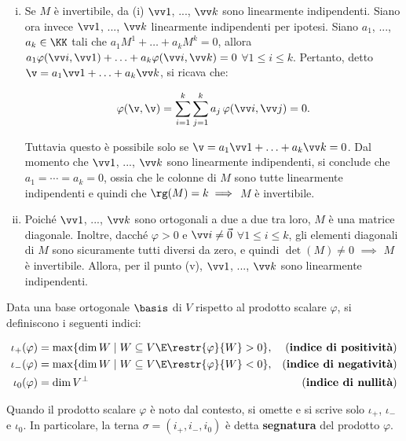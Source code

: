 \documentclass[11pt]{article}
\begin{document}
\begin{solution}
\begin{enumerate}[(i)]
			\item Se $M$ è invertibile, da (i) $\vv1$, ..., $\vv k$ sono linearmente indipendenti. Siano ora
			invece $\vv 1$, ..., $\vv k$ linearmente indipendenti per ipotesi. Siano $a_1$, ..., $a_k \in \KK$ tali
			che $a_1 M^1 + \ldots + a_k M^k = 0$, allora $a_1 \varphi(\vv i, \vv 1) + \ldots + a_k \varphi(\vv i, \vv k) = 0$ $\forall 1 \leq i \leq k$. Pertanto, detto $\v = a_1 \vv 1 + \ldots + a_k \vv k$, si ricava che:
			
			\[ \varphi(\v, \v) = \sum_{i=1}^k \sum_{j=1}^k a_j \, \varphi(\vv i, \vv j) = 0. \]
			
			Tuttavia questo è possibile solo se $\v = a_1 \vv 1 + \ldots + a_k \vv k = 0$. Dal momento che
			$\vv 1$, ..., $\vv k$ sono linearmente indipendenti, si conclude che $a_1 = \cdots = a_k = 0$, ossia
			che le colonne di $M$ sono tutte linearmente indipendenti e quindi che $\rg(M) = k \implies$ $M$ è invertibile.
			
			\item Poiché $\vv 1$, ..., $\vv k$ sono ortogonali a due a due tra loro, $M$ è una matrice diagonale.
			Inoltre, dacché $\varphi > 0$ e $\vv i \neq \vec 0$ $\forall 1 \leq i \leq k$, gli elementi diagonali di $M$ sono sicuramente tutti diversi da zero, e quindi $\det (M) \neq 0$ $\implies$ $M$ è invertibile. Allora,
			per il punto (v), $\vv 1$, ..., $\vv k$ sono linearmente indipendenti.
		\end{enumerate}
	\end{solution}

	\begin{definition}
		Data una base ortogonale $\basis$ di $V$ rispetto al prodotto
		scalare $\varphi$,
		si definiscono i seguenti indici:
		
		\begin{align*}
			\iota_+(\varphi) &= \max\{ \dim W \mid W \subseteq V \E \restr{\varphi}{W} > 0 \}, &\text{(}\textbf{indice di positività}\text{)} \\
			\iota_-(\varphi) &= \max\{ \dim W \mid W \subseteq V \E \restr{\varphi}{W} < 0 \}, &\text{(}\textbf{indice di negatività}\text{)}\\
			\iota_0(\varphi) &= \dim V^\perp &\text{(}\textbf{indice di nullità}\text{)}
		\end{align*}
	
		Quando il prodotto scalare $\varphi$ è noto dal contesto, si omette
		e si scrive solo $\iota_+$, $\iota_-$ e $\iota_0$. In particolare,
		la terna $\sigma = (i_+, i_-, i_0)$ è detta \textbf{segnatura} del
		prodotto $\varphi$.
	\end{definition}
	
\end{document}
